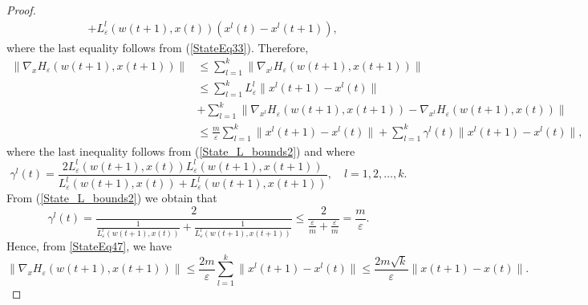\documentclass[11pt]{article}
\numberwithin{equation}{section}
\begin{document}
\begin{proof}
\begin{equation}
\begin{aligned}
	&+ L^l_{\varepsilon}(w(t+1),x(t)) \left( x^l(t) - x^l(t+1) \right) ,
\end{aligned}
\end{equation}
where the last equality follows from (\ref{StateEq33}). Therefore,
\begin{equation}
\begin{aligned}
	\| \nabla_x H_{\varepsilon}(w(t+1),x(t+1)) \| 
	&\leq \sum\limits_{l=1}^{k} \| \nabla_{x^l} H_{\varepsilon}(w(t+1),x(t+1)) \| \\
	&\leq \sum\limits_{l=1}^{k} L^l_{\varepsilon} \|x^l(t+1) - x^l(t)\| \\
	&+ \sum\limits_{l=1}^{k} \| \nabla_{x^l} H_{\varepsilon}(w(t+1),x(t+1)) - \nabla_{x^l} H_{\varepsilon}(w(t+1),x(t))\| \\
	&\leq \frac{m}{\varepsilon} \sum\limits_{l=1}^{k} \|x^l(t+1)-x^l(t)\| + \sum\limits_{l=1}^{k} \gamma^l(t) \|x^l(t+1)-x^l(t)\| , \label{StateEq47}
\end{aligned}
\end{equation}
where the last inequality follows from (\ref{State_L_bounds2}) and  where
\begin{equation*}
	\gamma^l(t) = \frac{2 L^l_{\varepsilon}(w(t+1),x(t)) L^l_{\varepsilon}(w(t+1),x(t+1))}{L^l_{\varepsilon}(w(t+1),x(t)) + L^l_{\varepsilon}(w(t+1),x(t+1))} , \quad l=1,2, \ldots, k.
\end{equation*}
From (\ref{State_L_bounds2}) we obtain that
\begin{equation*}
	\gamma^l(t) = \frac{2}{\frac{1}{L^l_{\varepsilon}(w(t+1),x(t))} + \frac{1}{L^l_{\varepsilon}(w(t+1),x(t+1))}} \leq \frac{2}{\frac{\varepsilon}{m} + \frac{\varepsilon}{m}} = \frac{m}{\varepsilon} .
\end{equation*}
Hence, from \ref{StateEq47}, we have 
\begin{equation*}
	\| \nabla_x H_{\varepsilon}(w(t+1),x(t+1))\| \leq \frac{2m}{\varepsilon} \sum\limits_{l=1}^{k} \|x^l(t+1)-x^l(t)\| \leq \frac{2m\sqrt{k}}{\varepsilon} \|x(t+1) - x(t)\|.
\end{equation*}

\end{proof}
\end{document}
